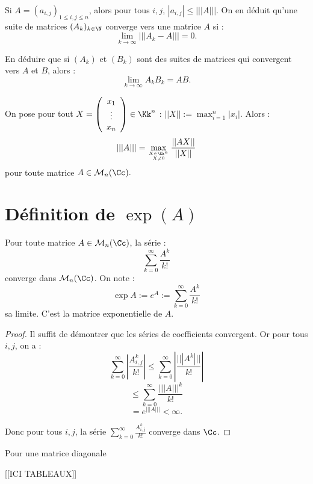 \documentclass[class=report,crop=false]{standalone}
\begin{document}
\begin{remarque*}
Si $A = (a_{i,j})_{1 \le i,j \le n}$, alors pour tous $i,j$,   $|a_{i,j}| \le |||A|||$. On en déduit qu'une suite de matrices $(A_k)_{k \in \N}$ converge vers une matrice $A$ si :
\[\lim_{k \to \infty} |||A_k-A||| = 0.\]
\end{remarque*}

\begin{exercicecours}
En déduire que si $(A_k)$ et $(B_k)$ sont des suites de matrices qui convergent vers $A$ et $B$, alors : \[\lim_{k \to \infty} A_k B_k  =AB .\]
\end{exercicecours}

\begin{exercicecours}
On pose pour tout $X=\left(\begin{array}{c}
x_1\\
\vdots\\
x_n
\end{array} \right)\in \Kk^n$ : $||X|| := \max_{i=1}^n|x_i|$. Alors :
\[|||A||| = \max_{X \in \Kk^n \atop X \neq 0} \frac{||AX||}{||X||}\]
pour toute matrice $A \in \mathcal{M}_n(\Cc).$ 
\end{exercicecours}

\section{Définition de  $\exp(A)$}

\begin{theoreme}
Pour toute matrice $A \in \mathcal{M}_n(\Cc)$, la série :
\[\sum_{k=0}^\infty \frac{A^k}{k!}\]
converge dans $\mathcal{M}_n(\Cc)$. On note :
\[\exp A := e^A := \sum_{k=0}^\infty \frac{A^k}{k!}\]
sa limite. C'est la matrice exponentielle de $A$.
\end{theoreme}

\begin{proof}
Il suffit de démontrer que les séries de coefficients convergent. Or pour tous $i,j$, on a :
\[\sum_{k=0}^\infty\left|\frac{A^k_{i,j}}{k!}\right| \le \sum_{k=0}^\infty\left|\frac{|||A^k|||}{k!}\right|\]
\[\le \sum_{k=0}^\infty \frac{|||A|||^k}{k!}\]
\[= e^{|||A|||} < \infty .\]

Donc pour tous $i,j$, la série $\sum_{k=0}^\infty \frac{A^k_{i,j}}{k!}$ converge dans $\Cc$.
\end{proof}

\begin{exercicecours}
Pour une matrice diagonale 

[[ICI TABLEAUX]]



\end{exercicecours}
\end{document}
